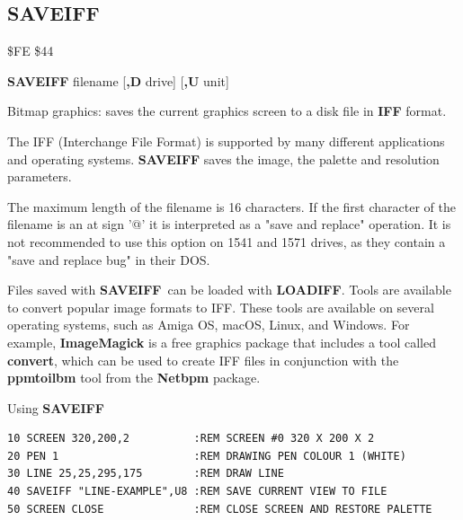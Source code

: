 \subsection{SAVEIFF}
\begin{description}[leftmargin=2cm,style=nextline]
\item [Token:] \$FE \$44
\item [Format:] {\bf SAVEIFF} filename [{\bf,D} drive] [{\bf,U} unit]
\item [Usage:]
   Bitmap graphics: saves the current graphics screen to a disk file in {\bf IFF} format.

   The IFF (Interchange File Format) is supported by many different applications
   and operating systems. {\bf SAVEIFF} saves the image, the palette
   and resolution parameters.

   \filenamedefinition
   The maximum length of the filename is 16 characters.
   If the first character of the filename is an at sign '@' it
   is interpreted as a "save and replace" operation. It is not recommended
   to use this option on 1541 and 1571 drives, as they
   contain a "save and replace bug" in their DOS.

   \drivedefinition

   \unitdefinition

\item [Remarks:]
   Files saved with {\bf SAVEIFF} can be loaded with {\bf LOADIFF}.
   Tools are available to convert popular image formats to IFF. These tools
   are available on several operating systems, such as Amiga OS, macOS, Linux, and Windows.
   For example, {\bf ImageMagick} is a free graphics package that includes a tool
   called {\bf convert}, which can be used to create IFF files in conjunction
   with the {\bf ppmtoilbm} tool from the {\bf Netbpm} package.

\item [Example:] Using {\bf SAVEIFF}
\begin{tcolorbox}[colback=black,coltext=white]
\verbatimfont{\codefont}
\begin{verbatim}
10 SCREEN 320,200,2          :REM SCREEN #0 320 X 200 X 2
20 PEN 1                     :REM DRAWING PEN COLOUR 1 (WHITE)
30 LINE 25,25,295,175        :REM DRAW LINE
40 SAVEIFF "LINE-EXAMPLE",U8 :REM SAVE CURRENT VIEW TO FILE
50 SCREEN CLOSE              :REM CLOSE SCREEN AND RESTORE PALETTE
\end{verbatim}
\end{tcolorbox}
\end{description}

